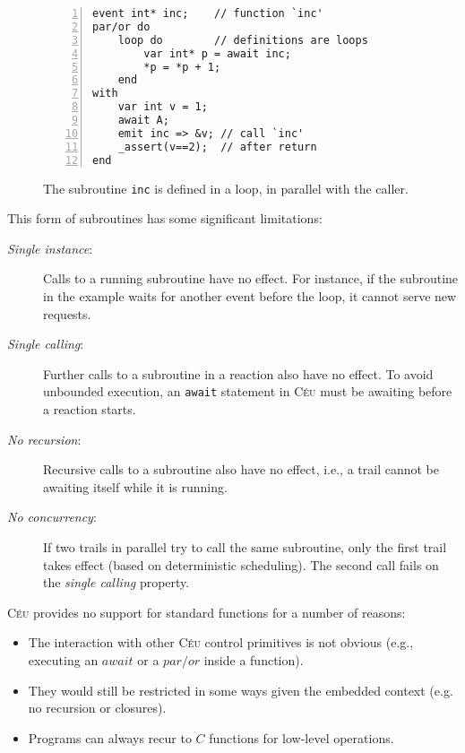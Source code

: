 \documentclass{acm_proc_article-sp}
\newcommand{\CEU}{\textsc{C\'{e}u}\xspace}
\newcommand{\code}[1] {{\small{\texttt{#1}}}}
\newcommand{\1}{\;}
\newcommand{\2}{\;\;}
\newcommand{\3}{\;\;\;}
\newcommand{\5}{\;\;\;\;\;}
\begin{document}
\begin{figure}
\begin{lstlisting}[numbers=left,xleftmargin=2em]
event int* inc;    // function `inc'
par/or do
    loop do        // definitions are loops
        var int* p = await inc;
        *p = *p + 1;
    end
with
    var int v = 1;
    await A;
    emit inc => &v; // call `inc'
    _assert(v==2);  // after return
end
\end{lstlisting}
\caption{ The subroutine \code{inc} is defined in a loop, in parallel with the 
caller.
\label{lst.sub}
}
\end{figure}

This form of subroutines has some significant limitations:

\begin{description}
\item[\emph{Single instance}:] Calls to a running subroutine have no effect.
For instance, if the subroutine in the example waits for another event before 
the loop, it cannot serve new requests.
%
\item[\emph{Single calling}:] Further calls to a subroutine in a reaction also 
have no effect.
To avoid unbounded execution, an \code{await} statement in \CEU must be 
awaiting before a reaction starts.
%
\item[\emph{No recursion}:] Recursive calls to a subroutine also have no 
effect, i.e., a trail cannot be awaiting itself while it is running.
%
\item[\emph{No concurrency}:] If two trails in parallel try to call the same 
subroutine, only the first trail takes effect (based on deterministic 
scheduling).
The second call fails on the \emph{single calling} property.
\end{description}

\vspace{5pt}
\CEU provides no support for standard functions for a number of reasons:
\begin{itemize}
\item The interaction with other \CEU control primitives is not obvious (e.g., 
executing an $await$ or a $par/or$ inside a function).
\item They would still be restricted in some ways given the embedded context 
(e.g.  no recursion or closures).
\item Programs can always recur to $C$ functions for low-level operations.
\end{itemize}
\end{document}
